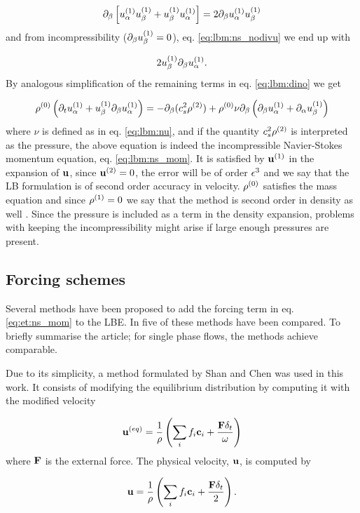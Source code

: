 \begin{equation}
\partial_{\beta} \left[ u_{\alpha}^{(1)}u_{\beta}^{(1)} + u_{\beta}^{(1)}u_{\alpha}^{(1)}
  \right] = 2\partial_{\beta}u_{\alpha}^{(1)}u_{\beta}^{(1)} 
\end{equation}
and from incompressibility ($\partial_{\beta}u_{\beta}^{(1)} = 0$),
eq. \eqref{eq:lbm:ns_nodivu} we end up with

\begin{equation}
2u_{\beta}^{(1)}\partial_{\beta}u_{\alpha}^{(1)}.
\end{equation}
By analogous simplification of the remaining terms in
eq. \eqref{eq:lbm:dino} we get

\begin{equation}\label{eq:lbm:ns_mom_index}
\rho^{(0)} \left( \partial_t u_{\alpha}^{(1)} +
u_{\beta}^{(1)}\partial_{\beta}u_{\alpha}^{(1)} \right) = -\partial_{\beta}(c_s^2
\rho^{(2)}) + \rho^{(0)}\nu \partial_{\beta} \left( \partial_{\beta}u_{\alpha}^{(1)} +
\partial_{\alpha}u_{\beta}^{(1)} \right)
\end{equation}
where $\nu$ is defined as in eq. \eqref{eq:lbm:nu}, and if the
quantity $c_s^2\rho^{(2)}$ is interpreted as the pressure, the above
equation is indeed the incompressible Navier-Stokes momentum equation,
eq. \eqref{eq:lbm:ns_mom}. It is satisfied by $\mathbf{u}^{(1)}$ in the
expansion of $\mathbf{u}$, since $\mathbf{u}^{(2)} = 0$, the error will be of order
$\epsilon^3$ and we say that the LB formulation is of second order accuracy
in velocity. $\rho^{(0)}$ satisfies the mass equation and since
$\rho^{(1)} = 0$ we say that the method is second order in density as
well \cite{junk-asym}. Since the pressure is included as a term in the
density expansion, problems with keeping the incompressibility might
arise if large enough pressures are present.

\subsection{Forcing schemes}\label{sec:lbm:forces}
Several methods have been proposed to add the forcing term in
eq. \eqref{eq:et:ns_mom} to the LBE. In \cite{krafczyk} five of these
methods have been compared. To briefly summarise the article; for
single phase flows, the methods achieve comparable. 

Due to its simplicity, a method formulated by Shan and Chen
\cite{shan-chen} was used in this work. It consists of modifying the
equilibrium distribution by computing it with the modified velocity

\begin{equation}
\mathbf{u}^{(eq)} = \frac{1}{\rho}\left(\sum_i f_i \mathbf{c}_i +
\frac{\mathbf{F}\delta_t}{\omega} \right)
\end{equation}
where $\mathbf{F}$ is the external force. The physical velocity, $\mathbf{u}$, is
computed by

\begin{equation}
\mathbf{u} = \frac{1}{\rho}\left(\sum_i f_i \mathbf{c}_i +
\frac{\mathbf{F}\delta_t}{2} \right).
\end{equation} 
